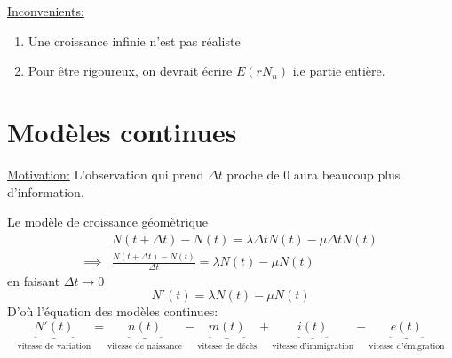 \underline{Inconvenients:}
\begin{enumerate}
    \item Une croissance infinie n'est pas réaliste
    \item Pour être rigoureux, on devrait écrire $E(rN_n)$ i.e partie entière.
\end{enumerate}

\section{Modèles continues}
\underline{Motivation:} L'observation qui prend $\Delta t$ proche de  $0$ aura beaucoup plus d'information. 
 \begin{remark}
   Le modèle de croissance géomètrique 
   \begin{align*}
       &N(t + \Delta t) - N(t) = \lambda \Delta t N(t) - \mu \Delta t N(t)\\
       \implies&\frac{N(t + \Delta t) - N(t)}{\Delta t} = \lambda N(t) - \mu N(t)
   \end{align*}
   en faisant $\Delta t \to 0$
    \[
        N'(t) = \lambda N(t) - \mu N(t)
    \] 
    D'où l'équation des modèles continues:
    \[
        \underbrace{N'(t)}_{\text{vitesse de variation}} = \underbrace{n(t)}_{\text{vitesse de naissance}} - \underbrace{m(t)}_{\text{vitesse de décès}} + \underbrace{i(t)}_{\text{vitesse d'immigration}} - \underbrace{e(t)}_{\text{vitesse d'émigration}}
    \] 
\end{remark}
